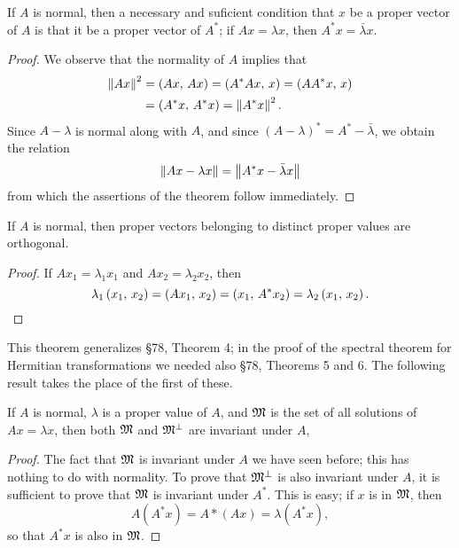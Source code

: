 \begin{theorem}
    If \(A\) is normal, then a necessary and suficient condition that \(x\) be a
    proper vector of \(A\) is that it be a proper vector of \(A^*\); if \(Ax =
    \lambda x\), then \(A^*x = \bar{\lambda}x\).
\end{theorem}

\begin{proof}
    We observe that the normality of \(A\) implies that
    \begin{align*}
        \left\lVert Ax\right\rVert^2 &= \left(Ax,\,Ax\right) = \left(A^*Ax,\,x\right) =
        \left(AA^* x,\,x\right)\\
        &= \left(A^*x,\,A^*x\right) = \left\lVert A^*x\right\rVert^2.
    \end{align*}
    Since \(A - \lambda\) is normal along with \(A\), and since \((A -
    \lambda)^* = A^* - \bar{\lambda}\), we obtain the relation
    \begin{equation*}
        \left\lVert Ax - \lambda x\right\rVert = \left\lVert A^*x - \bar{\lambda}x\right\rVert
    \end{equation*}
    from which the assertions of the theorem follow immediately.
\end{proof}

\begin{theorem}
    If \(A\) is normal, then proper vectors belonging to distinct proper values
    are orthogonal.
\end{theorem}

\begin{proof}
    If \(Ax_1 = \lambda_1 x_1\) and \(Ax_2 = \lambda_2 x_2\), then
    \begin{equation*}
        \lambda_1 \left(x_1,\,x_2\right) = \left(Ax_1,\,x_2\right) = \left(x_1,\,A^* x_2\right) = \lambda_2 \left(x_1,\,x_2\right).
    \end{equation*}
\end{proof}

This theorem generalizes §78, Theorem 4; in the proof of the spectral theorem
for Hermitian transformations we needed also §78, Theorems 5 and 6. The
following result takes the place of the first of these.

\begin{theorem}
    If \(A\) is normal, \(\lambda\) is a proper value of \(A\), and \(\mathfrak{M}\) is the set of all solutions of \(Ax = \lambda x\), then both \(\mathfrak{M}\) and \(\mathfrak{M}^{\perp}\) are invariant under \(A\),
\end{theorem}

\begin{proof}
    The fact that \(\mathfrak{M}\) is invariant under \(A\) we have seen before; this has nothing to do with normality. To prove that \(\mathfrak{M}^{\perp}\) is also invariant under \(A\), it is sufficient to prove that \(\mathfrak{M}\) is invariant under \(A^*\). This is easy; if \(x\) is in \(\mathfrak{M}\), then
    \begin{equation*}
        A(A^*x) = A*(Ax) = \lambda(A^*x),
    \end{equation*}
    so that \(A^*x\) is also in \(\mathfrak{M}\).
\end{proof}

